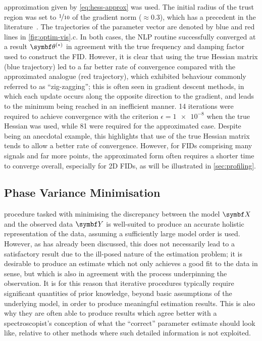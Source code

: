 approximation given by \cref{eq:hess-approx} was used. The initial
radius of the trust region was set to $\nicefrac{1}{10}$ of the gradient norm
($\approx 0.3$), which has a precedent in the literature~\cite{Gould2005}. The
trajectories of the parameter vector are denoted by blue and red lines in
\cref{fig:optim-vis}.c.
In both cases, the \ac{NLP} routine successfully converged at a result $\bthstar$
in agreement with the true frequency and damping factor used to construct the
\ac{FID}. However, it is clear that using the true Hessian matrix (blue trajectory)
led to a far better rate of convergence compared with the
approximated analogue (red trajectory), which exhibited behaviour commonly
referred to as ``zig-zagging''; this is often seen in gradient
descent methods, in which each update occurs along the opposite direction to
the gradient, and leads to the minimum being reached in an inefficient manner.
14 iterations were required to achieve convergence with the
criterion $\epsilon = \num[print-unity-mantissa=false]{1e-8}$
when the true Hessian was used, while 81 were required for the approximated
case. Despite being an anecdotal example, this highlights that use of the true
Hessian matrix tends to allow a better rate of convergence. However, for
\acp{FID} comprising many signals and far more points, the approximated form
often requires a shorter time to converge overall, especially for \ac{2D}
\acp{FID}, as will be illustrated in \cref{sec:profiling}.

\begin{remark}
    \label{rem:awgn}
\end{remark}

\subsection{Phase Variance Minimisation}
\label{subsec:phase-variance}
 procedure tasked with minimising the discrepancy between the model
$\bX$ and the observed data $\bY$ is well-suited to produce an accurate
holistic
representation of the data, assuming a sufficiently large
model order is used. However, as has already been discussed, this does not
necessarily lead to a satisfactory result due to the ill-posed nature of the
estimation problem;
it is desirable to produce an estimate which not only achieves a good fit to
the data in  sense, but which is also in agreement with the process
underpinning the observation. It is for this reason that iterative procedures
typically require significant quantities of prior knowledge, beyond basic
assumptions of the underlying model, in order to produce meaningful estimation
results.  This is also why they are often able to produce results which agree
better with a spectroscopist's conception of what the ``correct'' parameter
estimate should look like, relative to other methods where such detailed
information is not exploited.

